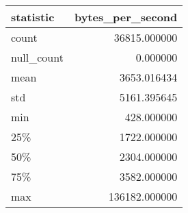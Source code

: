 \begin{tabular}{lr}
    \toprule
    statistic & bytes\_per\_second \\
    \midrule
    count & 36815.000000 \\
    null\_count & 0.000000 \\
    mean & 3653.016434 \\
    std & 5161.395645 \\
    min & 428.000000 \\
    25\% & 1722.000000 \\
    50\% & 2304.000000 \\
    75\% & 3582.000000 \\
    max & 136182.000000 \\
    \bottomrule
\end{tabular}
